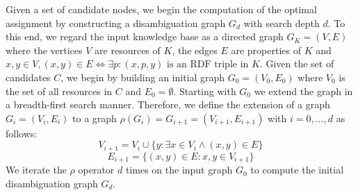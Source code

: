 \documentclass{llncs}
\begin{document}
Given a set of candidate nodes, we begin the computation of the optimal assignment by constructing a disambiguation graph $G_d$ with search depth $d$.
To this end, we regard the input knowledge base as a directed graph $G_K = (V, E)$ where the vertices $V$ are resources of $K$, the edges $E$ are properties of $K$ and $x,y\in V, (x,y) \in E \Leftrightarrow \exists p : (x, p, y) \mbox{ is an RDF triple in }K$.
Given the set of candidates $C$, we begin by building an initial graph $G_0 = (V_0, E_0)$ where $V_0$ is the set of all resources in $C$ and $E_0=\emptyset$. %
Starting with $G_0$ we extend the graph in a breadth-first search manner.
Therefore, we define the extension of a graph $G_i = (V_i, E_i)$ to a graph $\rho(G_i) = G_{i+1} = (V_{i+1}, E_{i+1})$ with $i=0, \ldots, d$ as follows:
\begin{equation}
V_{i+1} = V_i \cup \{y : \exists x \in V_i \wedge (x, y) \in E\}
\end{equation}
\begin{equation}
E_{i+1} = \{(x,y) \in E: x, y \in V_{i+1}\}
\end{equation}
We iterate the $\rho$ operator $d$ times on the input graph $G_0$ to compute the initial disambiguation graph $G_d$.

\end{document}
